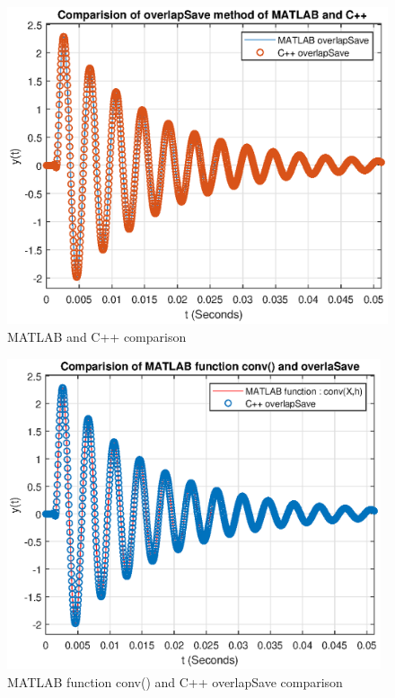 \begin{refsection}
\begin{figure}[h]
	\centering
	\includegraphics[width=12cm]{./algorithms/overlap_save/figures/sinusoid_with_exponent_matlab_and_C++.eps}
	\caption{MATLAB and C++ comparison}\label{sinusoid_with_exponent_matlab_and_C++}
\end{figure}

\begin{figure}[h]
	\centering
	\includegraphics[width=11cm]{./algorithms/overlap_save/figures/sinusoid_with_exponent_conv_and_C++.eps}
	\caption{MATLAB function conv() and C++ overlapSave comparison}\label{sinusoid_with_exponent_conv_and_C++}
\end{figure}

\newpage

\end{refsection}
